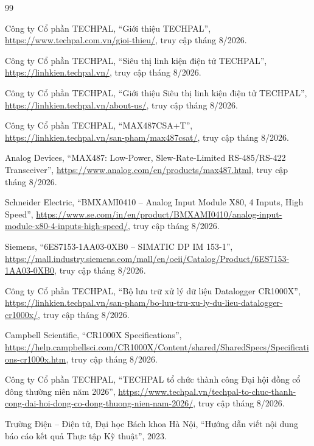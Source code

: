 \begin{thebibliography}{99}

Công ty Cổ phần TECHPAL, ``Giới thiệu TECHPAL'',
\url{https://www.techpal.com.vn/gioi-thieu/}, truy cập tháng 8/2026.

Công ty Cổ phần TECHPAL, ``Siêu thị linh kiện điện tử TECHPAL'',
\url{https://linhkien.techpal.vn/}, truy cập tháng 8/2026.

Công ty Cổ phần TECHPAL, ``Giới thiệu Siêu thị linh kiện điện tử TECHPAL'',
\url{https://linhkien.techpal.vn/about-us/},
truy cập tháng 8/2026.

Công ty Cổ phần TECHPAL, ``MAX487CSA+T'',
\url{https://linhkien.techpal.vn/san-pham/max487csat/},
truy cập tháng 8/2026.

Analog Devices, ``MAX487: Low-Power, Slew-Rate-Limited RS-485/RS-422
Transceiver'', \url{https://www.analog.com/en/products/max487.html},
truy cập tháng 8/2026.

Schneider Electric, ``BMXAMI0410 -- Analog Input Module X80, 4 Inputs, High
Speed'',
\url{https://www.se.com/in/en/product/BMXAMI0410/analog-input-module-x80-4-inputs-high-speed/},
truy cập tháng 8/2026.

Siemens, ``6ES7153-1AA03-0XB0 -- SIMATIC DP IM 153-1'',
\url{https://mall.industry.siemens.com/mall/en/oeii/Catalog/Product/6ES7153-1AA03-0XB0},
truy cập tháng 8/2026.

Công ty Cổ phần TECHPAL, ``Bộ lưu trữ xử lý dữ liệu Datalogger CR1000X'',
\url{https://linhkien.techpal.vn/san-pham/bo-luu-tru-xu-ly-du-lieu-datalogger-cr1000x/},
truy cập tháng 8/2026.

Campbell Scientific, ``CR1000X Specifications'',
\url{https://help.campbellsci.com/CR1000X/Content/shared/SharedSpecs/Specifications-cr1000x.htm},
truy cập tháng 8/2026.

Công ty Cổ phần TECHPAL, ``TECHPAL tổ chức thành công Đại hội đồng cổ đông
thường niên năm 2026'', \url{https://www.techpal.vn/techpal-to-chuc-thanh-cong-dai-hoi-dong-co-dong-thuong-nien-nam-2026/},
truy cập tháng 8/2026.

Trường Điện -- Điện tử, Đại học Bách khoa Hà Nội, ``Hướng dẫn viết nội dung báo
cáo kết quả Thực tập Kỹ thuật'', 2023.

\end{thebibliography}
